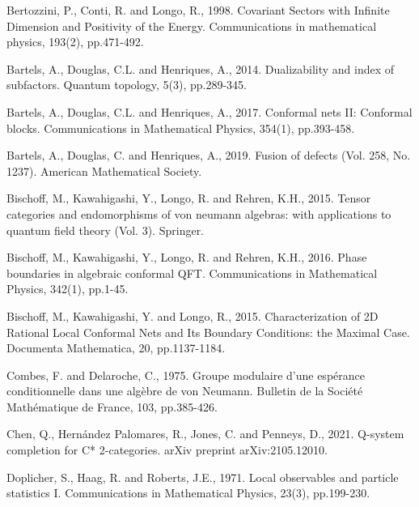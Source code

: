 \documentclass[12pt,a4paper,notitlepage]{article}
\theoremstyle{definition}
\theoremstyle{plain}
\numberwithin{equation}{section}
\begin{document}
	\begin{thebibliography}{999999}
		\footnotesize	
		
		
		
		

Bertozzini, P., Conti, R. and Longo, R., 1998. Covariant Sectors with Infinite Dimension and Positivity of the Energy. Communications in mathematical physics, 193(2), pp.471-492.

Bartels, A., Douglas, C.L. and Henriques, A., 2014. Dualizability and index of subfactors. Quantum topology, 5(3), pp.289-345.

Bartels, A., Douglas, C.L. and Henriques, A., 2017. Conformal nets II: Conformal blocks. Communications in Mathematical Physics, 354(1), pp.393-458.

Bartels, A., Douglas, C. and Henriques, A., 2019. Fusion of defects (Vol. 258, No. 1237). American Mathematical Society.

Bischoff, M., Kawahigashi, Y., Longo, R. and Rehren, K.H., 2015. Tensor categories and endomorphisms of von neumann algebras: with applications to quantum field theory (Vol. 3). Springer.

Bischoff, M., Kawahigashi, Y., Longo, R. and Rehren, K.H., 2016. Phase boundaries in algebraic conformal QFT. Communications in Mathematical Physics, 342(1), pp.1-45.

Bischoff, M., Kawahigashi, Y. and Longo, R., 2015. Characterization of 2D Rational Local Conformal Nets and Its Boundary Conditions: the Maximal Case. Documenta Mathematica, 20, pp.1137-1184.

Combes, F. and Delaroche, C., 1975. Groupe modulaire d'une espérance conditionnelle dans une algèbre de von Neumann. Bulletin de la Société Mathématique de France, 103, pp.385-426.

Chen, Q., Hernández Palomares, R., Jones, C. and Penneys, D., 2021. Q-system completion for C* 2-categories. arXiv preprint arXiv:2105.12010.

Doplicher, S., Haag, R. and Roberts, J.E., 1971. Local observables and particle statistics I. Communications in Mathematical Physics, 23(3), pp.199-230.


\end{thebibliography}
\end{document}
